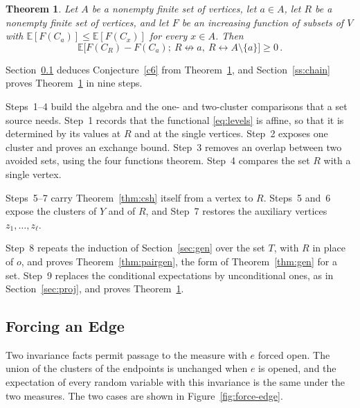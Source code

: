 \documentclass[11pt]{article}
\newtheorem{theorem}{Theorem}[section]
\theoremstyle{definition}
\theoremstyle{remark}
\newcommand{\EE}{\mathbb E}
\newcommand{\con}{\leftrightarrow}
\newcommand{\ncon}{\nleftrightarrow}
\begin{document}
\begin{theorem}\label{thm:fm2}
Let $A$ be a nonempty finite set of vertices, let $a\in A$, let $R$ be a nonempty finite
set of vertices, and let $F$ be an increasing function of subsets of $V$ with
$\EE[F(C_a)]\leq\EE[F(C_x)]$ for every $x\in A$. Then
\begin{equation}\label{eq:fm2}
 \EE\bigl[F(C_R)-F(C_a);\ R\ncon a,\ R\con A\setminus\{a\}\bigr]\geq 0\,.
\end{equation}
\end{theorem}

Section~\ref{ss:c6red} deduces Conjecture~\ref{c6} from Theorem~\ref{thm:fm2}, and
Section~\ref{ss:chain} proves Theorem~\ref{thm:fm2} in nine steps.

Steps~1--4 build the algebra and the one- and two-cluster comparisons that a set source
needs. Step~1 records that the functional \eqref{eq:levels} is affine, so that it is
determined by its values at $R$ and at the single vertices. Step~2 exposes one cluster and
proves an exchange bound. Step~3 removes an overlap between two avoided sets, using the four
functions theorem. Step~4 compares the set $R$ with a single vertex.

Steps~5--7 carry Theorem~\ref{thm:csh} itself from a vertex to $R$. Steps~5 and~6 expose
the clusters of $Y$ and of $R$, and Step~7 restores the auxiliary vertices
$z_1,\dots,z_\ell$.

Step~8 repeats the induction of Section~\ref{sec:gen} over the set $T$, with $R$ in place
of $o$, and proves Theorem~\ref{thm:pairgen}, the form of Theorem~\ref{thm:gen} for a
set. Step~9 replaces the conditional expectations by unconditional ones, as in
Section~\ref{sec:proj}, and proves Theorem~\ref{thm:fm2}.

\subsection{Forcing an Edge}\label{ss:c6red}

Two invariance facts permit passage to the measure with $e$ forced open. The union of the
clusters of the endpoints is unchanged when $e$ is opened, and the expectation of every
random variable with this invariance is the same under the two measures. The two cases
are shown in Figure~\ref{fig:force-edge}.
\end{document}

